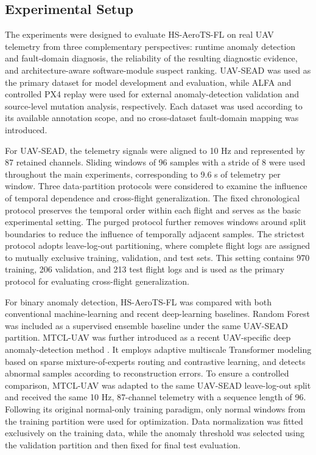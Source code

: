 \subsection{Experimental Setup}
\label{sec:experimental_protocols}

The experiments were designed to evaluate HS-AeroTS-FL on real UAV telemetry from three complementary perspectives: runtime anomaly detection and fault-domain diagnosis, the reliability of the resulting diagnostic evidence, and architecture-aware software-module suspect ranking. UAV-SEAD was used as the primary dataset for model development and evaluation, while ALFA and controlled PX4 replay were used for external anomaly-detection validation and source-level mutation analysis, respectively. Each dataset was used according to its available annotation scope, and no cross-dataset fault-domain mapping was introduced.

For UAV-SEAD, the telemetry signals were aligned to 10 Hz and represented by 87 retained channels. Sliding windows of 96 samples with a stride of 8 were used throughout the main experiments, corresponding to 9.6 s of telemetry per window. Three data-partition protocols were considered to examine the influence of temporal dependence and cross-flight generalization. The fixed chronological protocol preserves the temporal order within each flight and serves as the basic experimental setting. The purged protocol further removes windows around split boundaries to reduce the influence of temporally adjacent samples. The strictest protocol adopts leave-log-out partitioning, where complete flight logs are assigned to mutually exclusive training, validation, and test sets. This setting contains 970 training, 206 validation, and 213 test flight logs and is used as the primary protocol for evaluating cross-flight generalization.

For binary anomaly detection, HS-AeroTS-FL was compared with both conventional machine-learning and recent deep-learning baselines. Random Forest was included as a supervised ensemble baseline under the same UAV-SEAD partition. MTCL-UAV was further introduced as a recent UAV-specific deep anomaly-detection method \cite{hu2025mtcl}. It employs adaptive multiscale Transformer modeling based on sparse mixture-of-experts routing and contrastive learning, and detects abnormal samples according to reconstruction errors. To ensure a controlled comparison, MTCL-UAV was adapted to the same UAV-SEAD leave-log-out split and received the same 10 Hz, 87-channel telemetry with a sequence length of 96. Following its original normal-only training paradigm, only normal windows from the training partition were used for optimization. Data normalization was fitted exclusively on the training data, while the anomaly threshold was selected using the validation partition and then fixed for final test evaluation.

